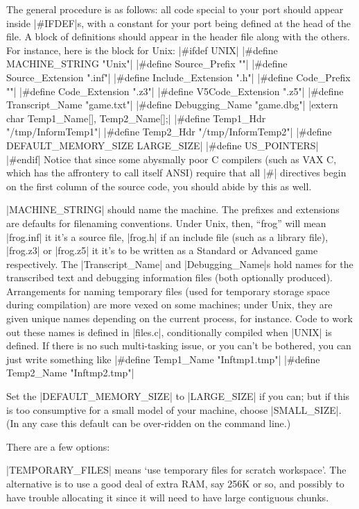 The general procedure is as follows: all code special to your port should
appear inside |#IFDEF|s, with a constant for your port being defined
at the head of the file.  A block of definitions should appear in the
header file along with the others.  For instance, here is the block for
Unix:
\beginlines
|#ifdef UNIX|
|#define MACHINE_STRING   "Unix"|
|#define Source_Prefix    ""|
|#define Source_Extension ".inf"|
|#define Include_Extension ".h"|
|#define Code_Prefix      ""|
|#define Code_Extension   ".z3"|
|#define V5Code_Extension ".z5"|
|#define Transcript_Name "game.txt"|
|#define Debugging_Name  "game.dbg"|
|extern char Temp1_Name[], Temp2_Name[];|
|#define Temp1_Hdr "/tmp/InformTemp1"|
|#define Temp2_Hdr "/tmp/InformTemp2"|
|#define DEFAULT_MEMORY_SIZE LARGE_SIZE|
|#define US_POINTERS|
|#endif|
\endlines
Notice that since some abysmally poor C compilers (such as VAX C, which
has the affrontery to call itself ANSI) require that all |#| directives
begin on the first column of the source code, you should abide by this
as well.

|MACHINE_STRING| should name the machine.  The prefixes and extensions
are defaults for filenaming conventions.  Under Unix, then, ``frog''
will mean |frog.inf| it it's a source file, |frog.h| if an include
file (such as a library file), |frog.z3| or |frog.z5| it it's to be
written as a Standard or Advanced game respectively.  The
|Transcript_Name| and |Debugging_Name|s hold names for the transcribed
text and debugging information files (both optionally produced).
Arrangements for naming temporary files (used for temporary storage
space during compilation) are more vexed on some machines; under Unix,
they are given unique names depending on the current process, for
instance.  Code to work out these names is defined in |files.c|,
conditionally compiled when |UNIX| is defined.  If there is no such
multi-tasking issue, or you can't be bothered, you can just write
something like
\beginlines
|#define Temp1_Name "Inftmp1.tmp"|
|#define Temp2_Name "Inftmp2.tmp"|
\endlines

Set the |DEFAULT_MEMORY_SIZE| to |LARGE_SIZE| if you can; but if this is
too consumptive for a small model of your machine, choose |SMALL_SIZE|.
(In any case this default can be over-ridden on the command line.)

There are a few options:

|TEMPORARY_FILES| means `use temporary files for scratch workspace'.
The alternative is to use a good deal of extra RAM, say 256K or so,
and possibly to have trouble allocating it since it will need to
have large contiguous chunks.

